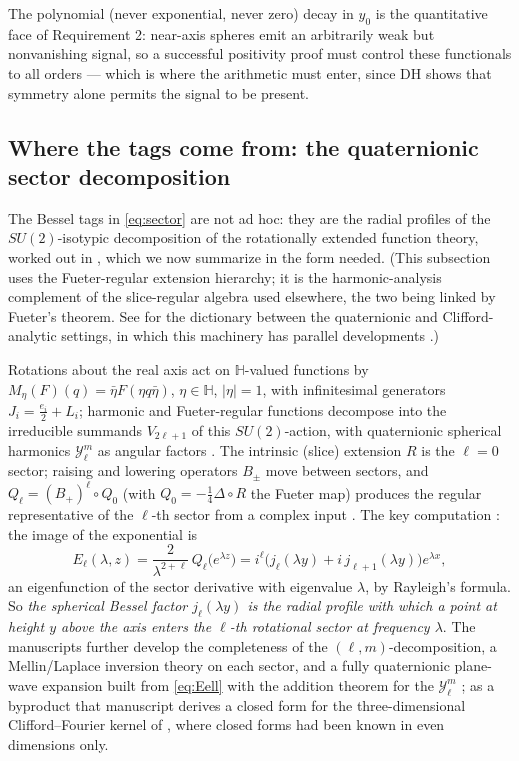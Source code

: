 \documentclass[11pt]{amsart}
\theoremstyle{plain}
\theoremstyle{definition}
\theoremstyle{remark}
\newcommand{\HH}{\mathbb{H}}
\begin{document}
The polynomial (never exponential, never zero) decay in $y_0$ is the quantitative face of
Requirement 2: near-axis spheres emit an arbitrarily weak but nonvanishing signal, so a
successful positivity proof must control these functionals to all orders --- which is where the
arithmetic must enter, since DH shows that symmetry alone permits the signal to be present.

\subsection{Where the tags come from: the quaternionic sector decomposition}\label{sec:sectors}

The Bessel tags in \eqref{eq:sector} are not ad hoc: they are the radial profiles of the
$SU(2)$-isotypic decomposition of the rotationally extended function theory, worked out in
\cite{Baker2015,Baker2016}, which we now summarize in the form needed. (This subsection uses the
Fueter-regular extension hierarchy; it is the harmonic-analysis complement of the slice-regular
algebra used elsewhere, the two being linked by Fueter's theorem. See
\cite{BoryReyesShapiro2010} for the dictionary between the quaternionic and Clifford-analytic
settings, in which this machinery has parallel developments
\cite{BrackxDeSchepperSommen2005,DeBieXu2011}.)

Rotations about the real axis act on $\HH$-valued functions by
$M_\eta(F)(q)=\bar\eta F(\eta q\bar\eta)$, $\eta\in\HH$, $|\eta|=1$, with infinitesimal
generators $J_i=\tfrac{e_i}2+L_i$; harmonic and Fueter-regular functions decompose into the
irreducible summands $V_{2\ell+1}$ of this $SU(2)$-action, with quaternionic spherical harmonics
$\mathcal Y_\ell^m$ as angular factors \cite[\S\S5--6]{Baker2015}. The intrinsic (slice)
extension $R$ is the $\ell=0$ sector; raising and lowering operators $B_\pm$ move between
sectors, and $Q_\ell=(B_+)^\ell\circ Q_0$ (with $Q_0=-\tfrac14\Delta\circ R$ the Fueter map)
produces the regular representative of the $\ell$-th sector from a complex input
\cite[\S\S6--7]{Baker2015}. The key computation \cite[\S6]{Baker2016}: the image of the
exponential is
\begin{equation}\label{eq:Eell}
E_\ell(\lambda,z)=\frac{2}{\lambda^{2+\ell}}\,Q_\ell\bigl(e^{\lambda z}\bigr)
=i^\ell\bigl(j_\ell(\lambda y)+i\,j_{\ell+1}(\lambda y)\bigr)e^{\lambda x},
\end{equation}
an eigenfunction of the sector derivative with eigenvalue $\lambda$, by Rayleigh's formula.
So \emph{the spherical Bessel factor $j_\ell(\lambda y)$ is the radial profile with which a point
at height $y$ above the axis enters the $\ell$-th rotational sector at frequency $\lambda$}. The
manuscripts further develop the completeness of the $(\ell,m)$-decomposition, a Mellin/Laplace
inversion theory on each sector, and a fully quaternionic plane-wave expansion built from
\eqref{eq:Eell} with the addition theorem for the $\mathcal Y_\ell^m$
\cite[\S\S5--7]{Baker2016}; as a byproduct that manuscript derives a closed form for the
three-dimensional Clifford--Fourier kernel of
\cite{BrackxDeSchepperSommen2005,DeBieXu2011}, where closed forms had been known in even
dimensions only.
\end{document}
